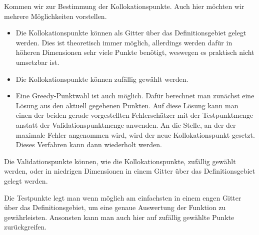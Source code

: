 Kommen wir zur Bestimmung der Kollokationspunkte. Auch hier möchten wir mehrere Möglichkeiten vorstellen.
\begin{itemize}
\item
Die Kollokationspunkte können als Gitter über das Definitionsgebiet gelegt werden. Dies ist theoretisch immer möglich, allerdings werden dafür in höheren Dimensionen sehr viele Punkte benötigt, weswegen es praktisch nicht umsetzbar ist. 
\item
Die Kollokationspunkte können zufällig gewählt werden.
\item
Eine Greedy-Punktwahl ist auch möglich. Dafür berechnet man zunächst eine Lösung aus den aktuell gegebenen Punkten. Auf diese Lösung kann man einen der beiden gerade vorgestellten Fehlerschätzer mit der Testpunktmenge anstatt der Validationspunktmenge anwenden. An die Stelle, an der der maximale Fehler angenommen wird, wird der neue Kollokationspunkt gesetzt. Dieses Verfahren kann dann wiederholt werden.
\end{itemize}

Die Validationspunkte können, wie die Kollokationspunkte, zufällig gewählt werden, oder in niedrigen Dimensionen in einem Gitter über das Definitionsgebiet gelegt werden.

Die Testpunkte legt man wenn möglich am einfachsten in einem engen Gitter über das Definitionsgebiet, um eine genaue Auswertung der Funktion zu gewährleisten. Ansonsten kann man auch hier auf zufällig gewählte Punkte zurückgreifen.